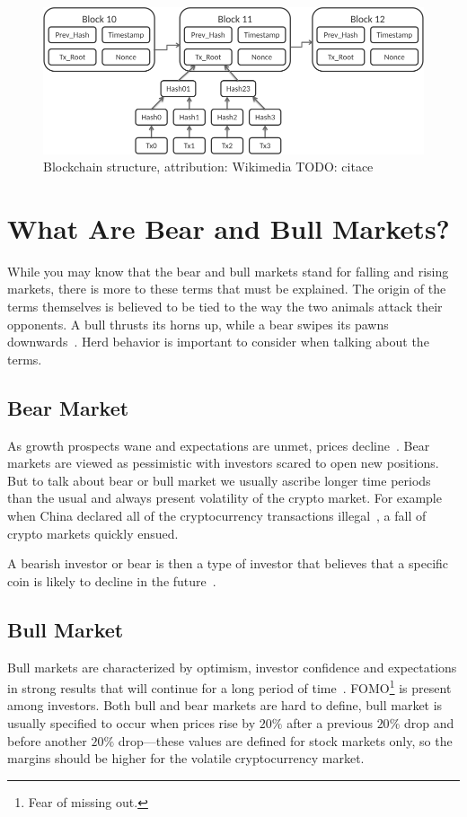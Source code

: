 \begin{figure}[!hbt]
    \centering
    \includegraphics[width=\columnwidth]{figures/Bitcoin_Block_Data.png}
    \caption{Blockchain structure, attribution: Wikimedia TODO: citace}
    \label{blockchain-figure}
\end{figure}

\section{What Are Bear and Bull Markets?}
While you may know that the bear and bull markets stand for falling and rising markets, there is more to these terms that must be explained. The origin of the terms themselves is believed to be tied to the way the two animals attack their opponents. A bull thrusts its horns up, while a bear swipes its pawns downwards~\cite{investopedia-bull-market}.
Herd behavior is important to consider when talking about the terms.

\subsection*{Bear Market}
As growth prospects wane and expectations are unmet, prices decline~\cite{investopedia-bear-market}. Bear markets are viewed as pessimistic with investors scared to open new positions. But to talk about bear or bull market we usually ascribe longer time periods than the usual and always present volatility of the crypto market. For example when China declared all of the cryptocurrency transactions illegal~\cite{china-ban}, a fall of crypto markets quickly ensued.

A bearish investor or bear is then a type of investor that believes that a specific coin is likely to decline in the future~\cite{investopedia-bull}.

\subsection*{Bull Market}
Bull markets are characterized by optimism, investor confidence and expectations in strong results that will continue for a long period of time~\cite{investopedia-bull-market}. FOMO\footnote{Fear of missing out.} is present among investors. Both bull and bear markets are hard to define, bull market is usually specified to occur when prices rise by $20\%$ after a previous $20\%$ drop and before another $20\%$ drop---these values are defined for stock markets only, so the margins should be higher for the volatile cryptocurrency market.


